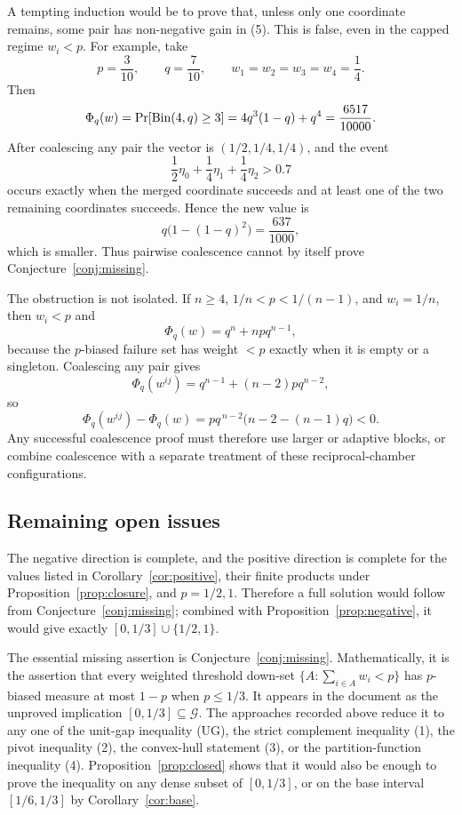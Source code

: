 \documentclass[12pt]{article}
\begin{document}
A tempting induction would be to prove that, unless only one coordinate remains,
some pair has non-negative gain in (5).  This is false, even in the capped regime
\(w_i<p\).  For example, take
\[
        p=\frac3{10},\qquad q=\frac7{10},\qquad
        w_1=w_2=w_3=w_4=\frac14 .
\]
Then
\[
   \Phi_q(w)=\Pr[{\rm Bin}(4,q)\ge3]
            =4q^3(1-q)+q^4=\frac{6517}{10000}.
\]
After coalescing any pair the vector is \((1/2,1/4,1/4)\), and the event
\[
        \frac12\eta_0+\frac14\eta_1+\frac14\eta_2>0.7
\]
occurs exactly when the merged coordinate succeeds and at least one of the two
remaining coordinates succeeds.  Hence the new value is
\[
        q\bigl(1-(1-q)^2\bigr)=\frac{637}{1000},
\]
which is smaller.  Thus pairwise coalescence cannot by itself prove
Conjecture~\ref{conj:missing}.

The obstruction is not isolated.  If \(n\ge4\),
\(1/n<p<1/(n-1)\), and \(w_i=1/n\), then \(w_i<p\) and
\[
 \Phi_q(w)=q^n+npq^{n-1},
\]
because the \(p\)-biased failure set has weight \(<p\) exactly when it is empty
or a singleton.  Coalescing any pair gives
\[
 \Phi_q(w^{ij})=q^{n-1}+(n-2)pq^{n-2},
\]
so
\[
 \Phi_q(w^{ij})-\Phi_q(w)
   =p q^{\,n-2}\bigl(n-2-(n-1)q\bigr)<0 .
\]
Any successful coalescence proof must therefore use larger or adaptive blocks,
or combine coalescence with a separate treatment of these reciprocal-chamber
configurations.
\subsection*{Remaining open issues}

The negative direction is complete, and the positive direction is complete for
the values listed in Corollary~\ref{cor:positive}, their finite products under
Proposition~\ref{prop:closure}, and \(p=1/2,1\).  Therefore a full solution
would follow from Conjecture~\ref{conj:missing}; combined with
Proposition~\ref{prop:negative}, it would give exactly
\([0,1/3]\cup\{1/2,1\}\).

The essential missing assertion is Conjecture~\ref{conj:missing}.  Mathematically, it
is the assertion that every weighted threshold down-set
\(\{A:\sum_{i\in A}w_i<p\}\) has \(p\)-biased measure at most \(1-p\) when
\(p\le1/3\).  It appears in the document as the unproved implication
\([0,1/3]\subseteq\mathcal G\).  The approaches recorded above reduce it to
any one of the unit-gap inequality (UG), the strict complement inequality (1),
the pivot inequality (2), the convex-hull statement (3), or the
partition-function inequality (4).  Proposition~\ref{prop:closed} shows that it
would also be enough to prove the inequality on any dense subset of
\([0,1/3]\), or on the base interval \([1/6,1/3]\) by
Corollary~\ref{cor:base}.
\end{document}
